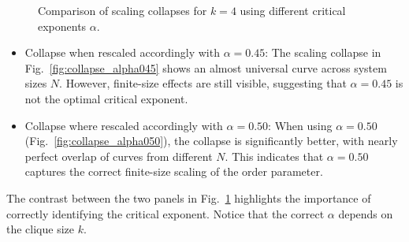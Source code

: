 \begin{figure}[h!]
\begin{minipage}[t]{0.48\textwidth}
        \label{fig:collapse_alpha050}
    \end{minipage}
    \caption{Comparison of scaling collapses for $k=4$ using different critical exponents $\alpha$.}
    \label{fig:collapse_k4}
\end{figure}

\begin{itemize}
\item Collapse when rescaled accordingly with $\alpha=0.45$:  
The scaling collapse in Fig.~\ref{fig:collapse_alpha045} shows an almost universal curve across system sizes $N$.  
However, finite-size effects are still visible, suggesting that $\alpha=0.45$ is not the optimal critical exponent.

\item Collapse where rescaled accordingly with $\alpha=0.50$:  
When using $\alpha=0.50$ (Fig.~\ref{fig:collapse_alpha050}), the collapse is significantly better, with nearly perfect overlap of curves from different $N$.  
This indicates that $\alpha=0.50$ captures the correct finite-size scaling of the order parameter.
\end{itemize}

The contrast between the two panels in Fig.~\ref{fig:collapse_k4} highlights the importance of correctly identifying the critical exponent.  
Notice that the correct $\alpha$ depends on the clique size $k$.


